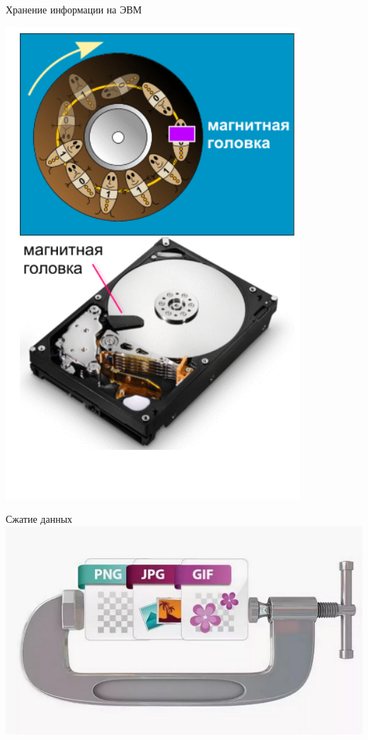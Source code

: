 \documentclass[10pt,pdf,hyperref={unicode}]{beamer}%
\begin{document}
\begin{frame}{Хранение информации на ЭВМ}
\begin{minipage}{0.4\textwidth}
    \includegraphics[width=\textwidth]{pzu.png}
  \end{minipage}
\end{frame}

\begin{frame}{Сжатие данных}
  \includegraphics[width=\textwidth]{zip.png}
\end{frame}
\end{document}
